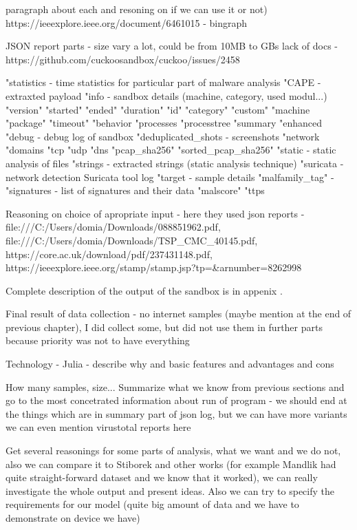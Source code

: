 paragraph about each and resoning on if we can use it or not)
https://ieeexplore.ieee.org/document/6461015 - bingraph


JSON report parts  
- size vary a lot, could be from 10MB to GBs
lack of docs - https://github.com/cuckoosandbox/cuckoo/issues/2458

"statistics - time statistics for particular part of malware analysis
"CAPE - extraxted payload
"info - sandbox details (machine, category, used modul...)
    "version"
    "started"
    "ended"
    "duration"
    "id"
    "category"
    "custom"
    "machine
    "package"
    "timeout"
"behavior
    "processes
    "processtree
    "summary
    "enhanced
"debug - debug log of sandbox
"deduplicated_shots - screenshots
"network
    "domains
    "tcp
    "udp
    "dns
    "pcap_sha256"
    "sorted_pcap_sha256"
"static - static analysis of files
"strings - extracted strings (static analysis technique)
"suricata - network detection Suricata tool log
"target - sample details
"malfamily_tag" - 
"signatures - list of signatures and their data
"malscore"
"ttps




Reasoning on choice of apropriate input
- here they used json reports - file:///C:/Users/domia/Downloads/088851962.pdf, file:///C:/Users/domia/Downloads/TSP_CMC_40145.pdf, https://core.ac.uk/download/pdf/237431148.pdf, https://ieeexplore.ieee.org/stamp/stamp.jsp?tp=&arnumber=8262998

Complete description of the output of the sandbox is in appenix .



Final result of data collection - no internet samples (maybe mention at the end of previous chapter), I did collect some, but did not use them in further parts because priority was not to have everything

Technology - Julia
  - describe why and basic features and advantages and cons


How many samples, size...
Summarize what we know from previous sections and go to the most concetrated information about run of program - we should end at the things which are in summary part of json log, but we can have more variants
we can even mention virustotal reports here

Get several reasonings for some parts of analysis, what we want and we do not, also we can compare it to Stiborek and other works (for example Mandlik had quite straight-forward dataset and we know that it worked), we can really investigate the whole output and present ideas. Also we can try to specify the requirements for our model (quite big amount of data and we have to demonstrate on device we have)


